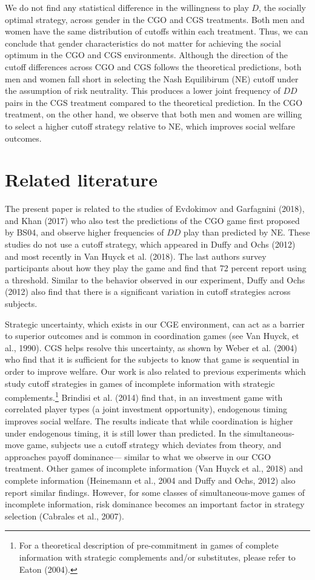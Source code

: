 \documentclass[12pt, letterpaper]{article}
\theoremstyle{plain}
\begin{document}
We do not find any statistical difference in the willingness to play $D$, the socially optimal strategy, across gender in the CGO and CGS treatments. Both men and women have the same distribution of cutoffs within each treatment. Thus, we can conclude that gender characteristics do not matter for achieving the social optimum in the CGO and CGS environments. Although the direction of the cutoff differences across CGO and CGS follows the theoretical predictions, both men and women fall short in selecting the Nash Equilibirum (NE) cutoff under the assumption of risk neutrality. This produces a lower joint frequency of $DD$ pairs in the CGS treatment compared to the theoretical prediction. In the CGO treatment, on the other hand, we observe that both men and women are willing to select a higher cutoff strategy relative to NE, which improves social welfare outcomes. 

\section{Related literature}

The present paper is related to the studies of Evdokimov and Garfagnini (2018), and Khan (2017) who also test the predictions of the CGO game first proposed by BS04, and observe higher frequencies of $DD$ play than predicted by NE. These studies do not use a cutoff strategy, which appeared in Duffy and Ochs (2012) and most recently in Van Huyck et al. (2018). The last authors survey participants about how they play the game and find that 72 percent report using a threshold. Similar to the behavior observed in our experiment, Duffy and Ochs (2012) also find that there is a significant variation in cutoff strategies across subjects. 

Strategic uncertainty, which exists in our CGE environment, can act as a barrier to superior outcomes and is common in coordination games (see Van Huyck, et al., 1990). CGS helps resolve this uncertainty, as shown by Weber et al. (2004) who find that it is sufficient for the subjects to know that game is sequential in order to improve welfare. Our work is also related to previous experiments which study cutoff strategies in games of incomplete information with strategic complements.\footnote{For a theoretical description of pre-commitment in games of complete information with strategic complements and/or substitutes, please refer to Eaton (2004).} Brindisi et al. (2014) find that, in an investment game with correlated player types (a joint investment opportunity), endogenous timing improves social welfare. The results indicate that while coordination is higher under endogenous timing, it is still lower than predicted. In the simultaneous-move game, subjects use a cutoff strategy which deviates from theory, and approaches payoff dominance--- similar to what we observe in our CGO treatment. Other games of incomplete information (Van Huyck et al., 2018) and complete information (Heinemann et al., 2004 and Duffy and Ochs, 2012) also report similar findings. However, for some classes of simultaneous-move games of incomplete information, risk dominance becomes an important factor in strategy selection (Cabrales et al., 2007).
\end{document}
